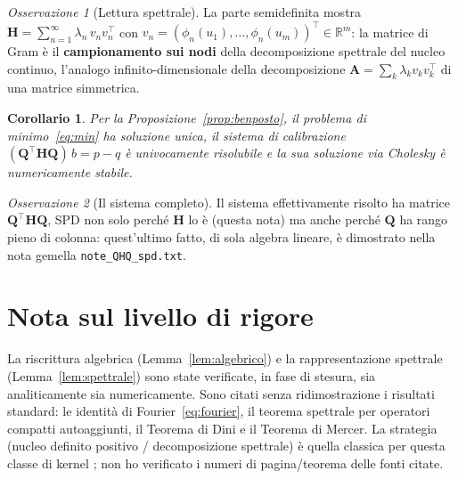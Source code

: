 \documentclass[11pt,a4paper]{article}
\theoremstyle{plain}
\newtheorem{corollario}[teorema]{Corollario}
\theoremstyle{remark}
\newtheorem*{osservazione}{Osservazione}
\newcommand{\Hmat}{\mathbf{H}}
\newcommand{\Qmat}{\mathbf{Q}}
\newcommand{\transp}{^{\!\top}}
\newcommand{\R}{\mathbb{R}}
\begin{document}
\begin{osservazione}[Lettura spettrale]
La parte semidefinita mostra $\Hmat=\sum_{n=1}^\infty\lambda_n\,v_nv_n\transp$ con
$v_n=(\phi_n(u_1),\dots,\phi_n(u_m))\transp\in\R^m$: la matrice di Gram \`e il
\textbf{campionamento sui nodi} della decomposizione spettrale del nucleo continuo, l'analogo
infinito-dimensionale della decomposizione $\mathbf A=\sum_k\lambda_k v_kv_k\transp$ di una
matrice simmetrica.
\end{osservazione}

\begin{corollario}
Per la Proposizione~\ref{prop:benposto}, il problema di minimo~\eqref{eq:min} ha soluzione unica,
il sistema di calibrazione $(\Qmat\transp\Hmat\Qmat)\,b=p-q$ \`e univocamente risolubile e la sua
soluzione via Cholesky \`e numericamente stabile.
\end{corollario}

\begin{osservazione}[Il sistema completo]
Il sistema effettivamente risolto ha matrice $\Qmat\transp\Hmat\Qmat$, SPD non solo perch\'e
$\Hmat$ lo \`e (questa nota) ma anche perch\'e $\Qmat$ ha rango pieno di colonna: quest'ultimo
fatto, di sola algebra lineare, \`e dimostrato nella nota gemella \texttt{note\_QHQ\_spd.txt}.
\end{osservazione}

\section*{Nota sul livello di rigore}
La riscrittura algebrica (Lemma~\ref{lem:algebrico}) e la rappresentazione spettrale
(Lemma~\ref{lem:spettrale}) sono state verificate, in fase di stesura, sia analiticamente sia
numericamente. Sono citati senza ridimostrazione i risultati standard: le identit\`a di
Fourier~\eqref{eq:fourier}, il teorema spettrale per operatori compatti autoaggiunti, il Teorema
di Dini e il Teorema di Mercer. La strategia (nucleo definito positivo / decomposizione spettrale)
\`e quella classica per questa classe di kernel \cite{aronszajn1950,wahba1990,fasshauer2007};
non ho verificato i numeri di pagina/teorema delle fonti citate.
\end{document}
